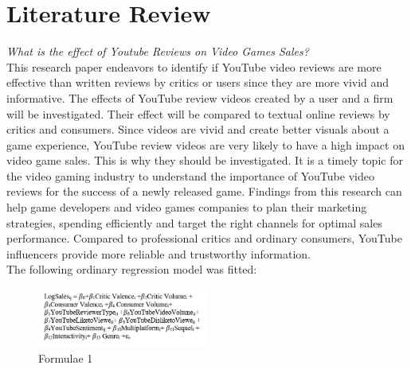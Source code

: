 \documentclass[conference]{IEEEtran}
\begin{document}
\section{Literature Review}
\textit{What is the effect of Youtube Reviews on Video Games Sales?}\\
This research paper endeavors to identify if YouTube video reviews are more effective than written reviews by critics or users since they are more vivid and informative. The effects of YouTube review videos created by a user and a firm will be investigated. Their effect will be compared to textual online reviews by critics and consumers. Since videos are vivid and create better visuals about a game experience, YouTube review videos are very likely to have a high impact on video game sales. This is why they should be investigated. It is a timely topic for the video gaming industry to understand the importance of YouTube video reviews for the success of a newly released game. Findings from this research can help game developers and video games companies to plan their marketing strategies, spending efficiently and target the right channels for optimal sales performance. Compared to professional critics and ordinary consumers, YouTube influencers provide more reliable and trustworthy information.\\
The following ordinary regression model was fitted:\\
\begin{figure}[h]
    \centering
    \includegraphics[width=0.5\textwidth]{L1F1.jpg}
    \caption{Formulae 1}
\end{figure}
\end{document}
